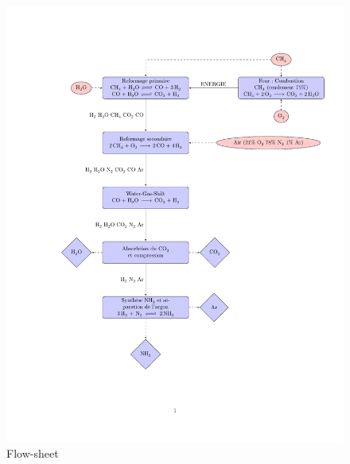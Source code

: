 \documentclass[a4paper, oneside, 12pt]{article}
\begin{document}
\begin{figure}[htp]
\includegraphics[scale=0.82]{flow_sheet.pdf}

	\caption{Flow-sheet}
\end{figure}
\end{document}
